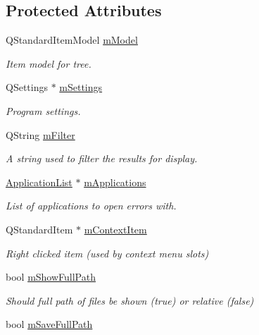 \subsection*{Protected Attributes}
\begin{DoxyCompactItemize}
\item 
Q\-Standard\-Item\-Model \hyperlink{class_results_tree_a8889b30c7b1a91bc7e8190fca9f7e6bd}{m\-Model}
\begin{DoxyCompactList}\small\item\em Item model for tree. \end{DoxyCompactList}\item 
Q\-Settings $\ast$ \hyperlink{class_results_tree_a7dba9cd0f96e3fc49fb13b7256319ebc}{m\-Settings}
\begin{DoxyCompactList}\small\item\em Program settings. \end{DoxyCompactList}\item 
Q\-String \hyperlink{class_results_tree_a1f4786e67be0097bc545284dab60362a}{m\-Filter}
\begin{DoxyCompactList}\small\item\em A string used to filter the results for display. \end{DoxyCompactList}\item 
\hyperlink{class_application_list}{Application\-List} $\ast$ \hyperlink{class_results_tree_a984dd04477ae0aaec99c604aeb5cc7e6}{m\-Applications}
\begin{DoxyCompactList}\small\item\em List of applications to open errors with. \end{DoxyCompactList}\item 
Q\-Standard\-Item $\ast$ \hyperlink{class_results_tree_add694da9be3cfcc2c7c185ed794d3048}{m\-Context\-Item}
\begin{DoxyCompactList}\small\item\em Right clicked item (used by context menu slots) \end{DoxyCompactList}\item 
bool \hyperlink{class_results_tree_ab09fc442b721823c61da0e735ae529c2}{m\-Show\-Full\-Path}
\begin{DoxyCompactList}\small\item\em Should full path of files be shown (true) or relative (false) \end{DoxyCompactList}\item 
bool \hyperlink{class_results_tree_a0d2d94d0193a1749d7d8028ef8325c6c}{m\-Save\-Full\-Path}

\end{DoxyCompactItemize}

